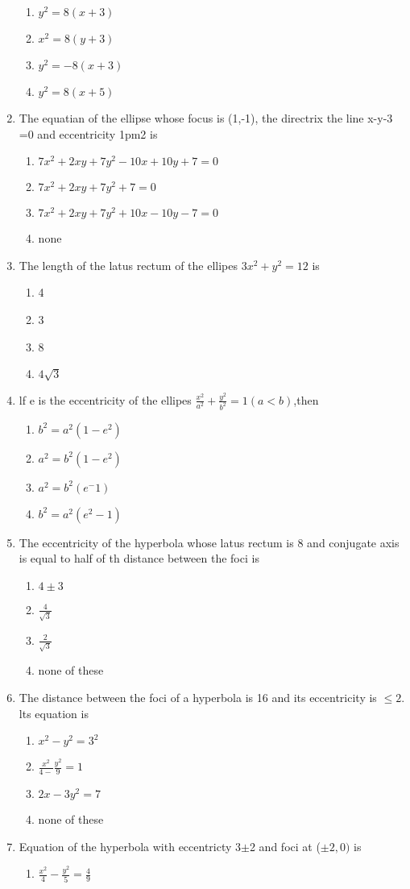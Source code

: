 \documentclass[12pt]{article}
\begin{document}
\begin{enumerate}
\begin{enumerate}
\item $y^2=8(x+3)$
\item $x^2=8(y+3)$
\item $y^2=-8(x+3)$
\item $y^2=8(x+5)$
\end{enumerate}
\item The equatian of the ellipse whose focus is (1,-1), the directrix the line x-y-3
=0 and eccentricity 1pm2 is
\begin{enumerate}
\item $7x^2+2xy+7y^2-10x+10y+7=0$
\item $7x^2+2xy+7y^2+7=0$
\item $7x^2+2xy+7y^2+10x-10y-7=0$ 
\item none
\end{enumerate}
\item The length of the latus rectum of the ellipes $3x^2+y^2=12$ is
\begin{enumerate}
\item 4
\item 3
\item 8
\item $4\sqrt{3}$
\end{enumerate}
\item lf e is the eccentricity of the ellipes $\frac{x^2}{a^2}+\frac{y^2}{b^2}=1(a<b)$,then
\begin{enumerate}
\item $b^2=a^2(1-e^2)$
\item $a^2=b^2(1-e^2)$
\item $a^2=b^2(e^-1)$
\item $b^2=a^2(e^2-1)$
\end{enumerate}
\item The eccentricity of the hyperbola whose latus rectum is 8 and conjugate axis is equal to half of th distance between the foci is 
\begin{enumerate}
\item $4\pm3$
\item $\frac{4}{\sqrt{3}}$
\item $\frac{2}{\sqrt{3}}$
\item none of these
\end{enumerate}
\item The distance between the foci of a hyperbola is 16 and its eccentricity is $\le{2}$. lts equation is
\begin{enumerate}
\item $x^2-y^2=3^2$
\item $\frac{x^2}{4-}\frac{y^2}{9}=1$
\item $2x-3y^2=7$
 \item none of these
 \end{enumerate}
 \item Equation of the hyperbola with eccentricty 3$\pm$2 and foci at ($\pm2,0)$ is
\begin{enumerate} 
	\item $\frac{x^2}{4}-\frac{y^2}{5}=\frac{4}{9}$


\end{enumerate}
\end{enumerate}
\end{document}
